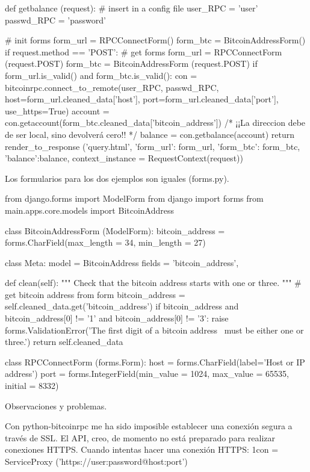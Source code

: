\documentclass[a4paper, 12pt]{book}
\begin{document}
def getbalance (request):
  # insert in a config file
  user_RPC = 'user'
  passwd_RPC = 'password'
 
  # init forms
  form_url = RPCConnectForm()
  form_btc = BitcoinAddressForm()
  if request.method == 'POST':
    # get forms
    form_url = RPCConnectForm (request.POST)
    form_btc = BitcoinAddressForm (request.POST)
    if form_url.is_valid() and form_btc.is_valid():
      con = bitcoinrpc.connect_to_remote(user_RPC, passwd_RPC,
          host=form_url.cleaned_data['host'],
          port=form_url.cleaned_data['port'], use_https=True)
      account = con.getaccount(form_btc.cleaned_data['bitcoin_address'])
      /* ¡¡La direccion debe de ser local, sino devolverá cero!! */
      balance = con.getbalance(account)
  return render_to_response ('query.html', {'form_url': form_url,
      'form_btc': form_btc, 'balance':balance},
      context_instance = RequestContext(request))

Los formularios para los dos ejemplos son iguales (forms.py).

from django.forms import ModelForm
from django import forms
from main.apps.core.models import BitcoinAddress
 
class BitcoinAddressForm (ModelForm):
    bitcoin_address = forms.CharField(max_length = 34, min_length = 27)
 
    class Meta:
        model = BitcoinAddress
        fields = {'bitcoin_address',}
 
    def clean(self):
        """
        Check that the bitcoin address starts with one or three.
        """
        # get bitcoin address from form
        bitcoin_address =  self.cleaned_data.get('bitcoin_address')
        if bitcoin_address and bitcoin_address[0] != '1' and bitcoin_address[0] != '3':
            raise forms.ValidationError('The first digit of a bitcoin address \
                    must be either one or three.')
        return self.cleaned_data
 
    class RPCConnectForm (forms.Form):
        host = forms.CharField(label='Host or IP address')
        port = forms.IntegerField(min_value = 1024, max_value = 65535, initial = 8332)

Observaciones y problemas.

    Con python-bitcoinrpc me ha sido imposible establecer una conexión segura a través de SSL. El API, creo, de momento no está preparado para realizar conexiones HTTPS. Cuando intentas hacer una conexión HTTPS:
    1con = ServiceProxy ('https://user:password@host:port')
\end{document}
